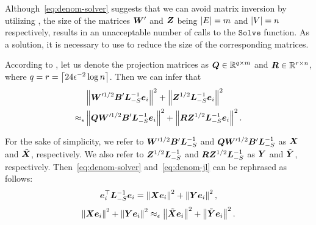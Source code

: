 \documentclass[10pt,journal,compsoc,twocolumn,twoside]{IEEEtran}
\begin{document}
Although~\eqref{eq:denom-solver} suggests that we can avoid matrix inversion by utilizing , the size of the matrices \(\boldsymbol{W}'\) and \(\boldsymbol{Z}\) being \(\left|E \right|=m\) and \(\left|V \right|=n\) respectively, results in an unacceptable number of calls to the \(\mathtt{Solve}\) function.
As a solution, it is necessary to use  to reduce the size of the corresponding matrices.

According to , let us denote the projection matrices as \(\boldsymbol{Q}\in\mathbb{R}^{q\times m}\) and \(\boldsymbol{R}\in\mathbb{R}^{r\times n}\), where \(q=r=\left\lceil24\epsilon^{-2}\log n\right\rceil\).
Then we can infer that
\begin{equation}\label{eq:denom-jl}
    \begin{split}
        &\left\Vert\boldsymbol{W}'^{1/2}\boldsymbol{B}'\boldsymbol{L}_{-S}^{-1}\boldsymbol{e}_i\right\Vert^2+\left\Vert\boldsymbol{Z}^{1/2}\boldsymbol{L}_{-S}^{-1}\boldsymbol{e}_i\right\Vert^2\\
        \approx_\epsilon&\left\Vert\boldsymbol{Q}\boldsymbol{W}'^{1/2}\boldsymbol{B}'\boldsymbol{L}_{-S}^{-1}\boldsymbol{e}_i\right\Vert^2+\left\Vert\boldsymbol{R}\boldsymbol{Z}^{1/2}\boldsymbol{L}_{-S}^{-1}\boldsymbol{e}_i\right\Vert^2.
    \end{split}
\end{equation}

For the sake of simplicity, we refer to \(\boldsymbol{W}'^{1/2}\boldsymbol{B}'\boldsymbol{L}_{-S}^{-1}\) and \(\boldsymbol{Q}\boldsymbol{W}'^{1/2}\boldsymbol{B}'\boldsymbol{L}_{-S}^{-1}\) as \(\boldsymbol{X}\) and \(\tilde{\boldsymbol{X}}\), respectively.
We also refer to \(\boldsymbol{Z}^{1/2}\boldsymbol{L}_{-S}^{-1}\) and \(\boldsymbol{R}\boldsymbol{Z}^{1/2}\boldsymbol{L}_{-S}^{-1}\) as \(\boldsymbol{Y}\) and \(\tilde{\boldsymbol{Y}}\), respectively.
Then~\eqref{eq:denom-solver} and~\eqref{eq:denom-jl} can be rephrased as follows:
\begin{equation}\label{eq:denom-solver-simp}
    \boldsymbol{e}_i^\top\boldsymbol{L}_{-S}^{-1}\boldsymbol{e}_i=\left\Vert\boldsymbol{X}\boldsymbol{e}_i\right\Vert^2+\left\Vert\boldsymbol{Y}\boldsymbol{e}_i\right\Vert^2,
\end{equation}
\begin{equation}\label{eq:denom-jl-simp}
    \left\Vert\boldsymbol{X}\boldsymbol{e}_i\right\Vert^2+\left\Vert\boldsymbol{Y}\boldsymbol{e}_i\right\Vert^2\approx_\epsilon\left\Vert\tilde{\boldsymbol{X}}\boldsymbol{e}_i\right\Vert^2+\left\Vert\tilde{\boldsymbol{Y}}\boldsymbol{e}_i\right\Vert^2.
\end{equation}
\end{document}
